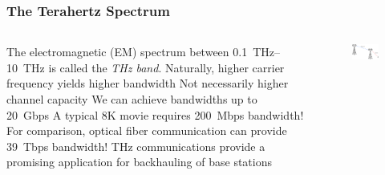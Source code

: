 \documentclass[10pt]{beamer}
\begin{document}
\begin{frame}
    \frametitle{The Terahertz Spectrum}
    \begin{columns}
        \normalsize
        \begin{column}{.6\textwidth}
            \begin{outline}
                \1 The electromagnetic (EM) spectrum between \SIrange{0.1}{10}{\THz} is called the \textit{THz band}.
                \1 Naturally, higher carrier frequency yields higher bandwidth
                \2 Not necessarily higher channel capacity
                \1 We can achieve bandwidths up to \SI{20}{Gbps}
                \2 A typical 8K movie requires \SI{200}{Mbps} bandwidth!
                \2 For comparison, optical fiber communication can provide \SI{39}{Tbps} bandwidth!
                \1 THz communications provide a promising application for backhauling of base stations
            \end{outline}
        \end{column}
        \begin{column}{.4\textwidth}
            \scriptsize
            \begin{figure}[T!]
                \centering
                \includegraphics[width=.95\textwidth]{backhaul.pdf}
                \label{fig:backhaul_network}
            \end{figure}
        \end{column}
    \end{columns}
\end{frame}
\end{document}
